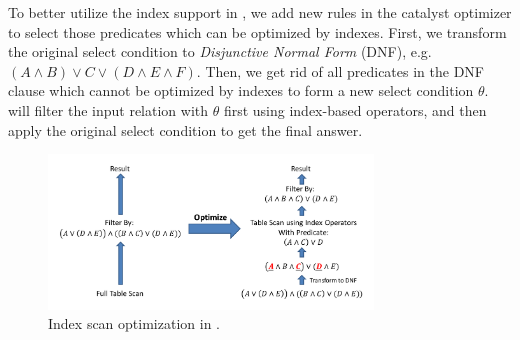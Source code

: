 
To better utilize the index support in \name, we add new rules in the
catalyst optimizer to select those predicates which can be optimized
by indexes. First, we transform the original select condition to {\em
  Disjunctive Normal Form} (DNF), e.g.
$(A \wedge B) \vee C \vee (D \wedge E \wedge F)$.  Then, we get rid of
all predicates in the DNF clause which cannot be optimized by indexes
to form a new select condition $\theta$. \name will filter the input
relation with $\theta$ first using index-based operators, and then
apply the original select condition to get the final answer.


\begin{figure}[t!]
	\centering
	\includegraphics[width=3.4in]{figs/optimize}
	\vspace{-8mm}
	\caption{Index scan optimization in \name.}
	\label{fig:optimize}
	\vspace{-4mm}
\end{figure}

